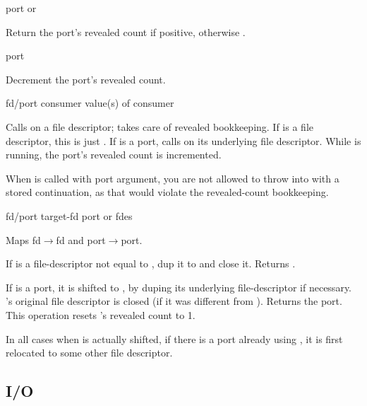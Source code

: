  {port} {{\integer} or \sharpf}
\begin{desc}
Return the port's revealed count if positive, otherwise \sharpf.
\end{desc}

 {port} {\undefined}
\begin{desc}
Decrement the port's revealed count.
\end{desc}

 {fd/port consumer} {value(s) of consumer}
\begin{desc}
  Calls  on a file descriptor; 
  takes care of revealed bookkeeping.
  If  is a file descriptor, this is just 
  .
  If  is a port, 
  calls  on its underlying file descriptor.
  While  is running, the port's revealed count is incremented.

  When  is called with port argument, you are not allowed to
  throw into  with a stored continuation, as that would violate
  the revealed-count bookkeeping.
\end{desc}

 {fd/port target-fd} {port or fdes}
\begin{desc}
    Maps fd$\rightarrow$fd and port$\rightarrow$port.

    If  is a file-descriptor not equal to , 
    dup it to  and close it. Returns . 

    If  is a port, it is shifted to , 
    by duping its underlying file-descriptor if necessary. 
    's original file descriptor is
    closed (if it was different from ). 
    Returns the port. 
    This operation resets 's revealed count to 1.

    In all cases when  is actually shifted, if there is a port
    already using , it is first relocated to some other file
    descriptor.
\end{desc}

\subsection{{\Unix} I/O}

